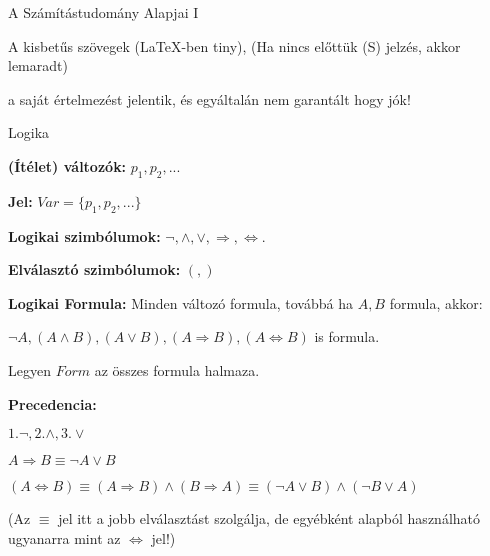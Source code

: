 \documentclass[10pt]{article}
\renewcommand{\\}{\par\noindent}
\begin{document}
\begin{frame}[plain]
\begin{tcolorbox}[center, colback={myyellow}, coltext={black}, colframe={myyellow}]
{\Huge A Számítástudomány Alapjai I}\\
\bigskip
\\
A kisbetűs szövegek (LaTeX-ben tiny), (Ha nincs előttük (S) jelzés, akkor lemaradt)\\
a saját értelmezést jelentik, és egyáltalán nem garantált hogy jók!
\end{tcolorbox}
\end{frame}


\begin{frame}[plain]
\begin{tcolorbox}[center, colback={myyellow}, coltext={black}, colframe={myyellow}]
    {\Huge Logika}
    \medskip
\end{tcolorbox}
\end{frame}

\begin{frame}

\begin{tcolorbox}[squeezed title={(Ítélet) változók, Logikai szimbólumok, Elválasztó szimbólumok, Logikai formula}]
\bigskip
\textbf{(Ítélet) változók:} $p_1, p_2, ...$\\
\hspace{1ex} \textbf{Jel: } $Var = \{p_1, p_2, ...\}$\\
\bigskip
\textbf{Logikai szimbólumok:} ${\neg}, {\land}, {\lor}, {\Rightarrow}, {\iff}.$\\
\bigskip
\textbf{Elválasztó szimbólumok:} $(, )$\\
\bigskip
\textbf{Logikai Formula:} Minden változó formula, továbbá ha $A, B$ formula, akkor:\\
\textbf{${\neg}A, (A \land B), (A \lor B), (A \Rightarrow B), (A \iff B)$} is formula.\\
\bigskip
Legyen $Form$ az összes formula halmaza.
\end{tcolorbox}

\begin{tcolorbox}[title={Megj}]
\textbf{Precedencia:}\\ 
\bigskip
$1. {\neg}, 2. {\land}, 3. {\lor}$\\
\bigskip
$A \Rightarrow B \equiv {\neg}A \lor B$\\
$(A \iff B) \equiv (A \Rightarrow B) \land (B \Rightarrow A) \equiv ({\neg}A \lor B) \land ({\neg}B \lor A)$\\
\bigskip
(Az $\equiv$ jel itt a jobb elválasztást szolgálja, de egyébként alapból használható ugyanarra mint az $\iff$ jel!)
\end{tcolorbox}
\end{frame}
\end{document}
